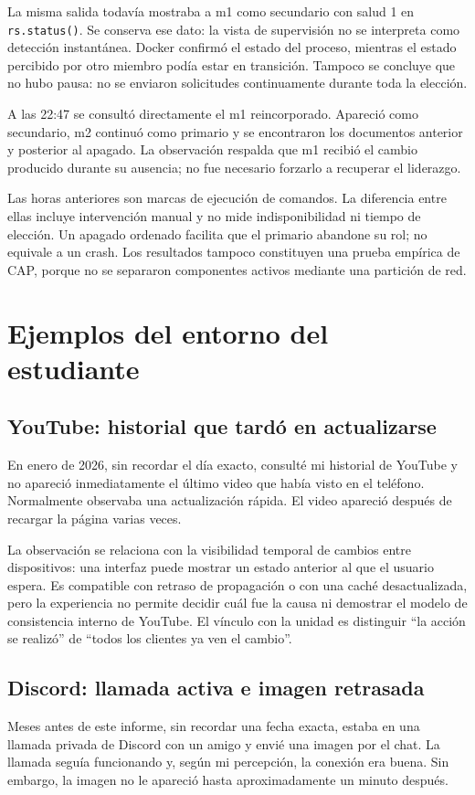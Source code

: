 La misma salida todavía mostraba a m1 como secundario con salud 1 en \texttt{rs.status()}. Se conserva ese dato: la vista de supervisión no se interpreta como detección instantánea. Docker confirmó el estado del proceso, mientras el estado percibido por otro miembro podía estar en transición. Tampoco se concluye que no hubo pausa: no se enviaron solicitudes continuamente durante toda la elección.

A las 22:47 se consultó directamente el m1 reincorporado. Apareció como secundario, m2 continuó como primario y se encontraron los documentos anterior y posterior al apagado. La observación respalda que m1 recibió el cambio producido durante su ausencia; no fue necesario forzarlo a recuperar el liderazgo.

Las horas anteriores son marcas de ejecución de comandos. La diferencia entre ellas incluye intervención manual y no mide indisponibilidad ni tiempo de elección. Un apagado ordenado facilita que el primario abandone su rol; no equivale a un crash. Los resultados tampoco constituyen una prueba empírica de CAP, porque no se separaron componentes activos mediante una partición de red.

\section{Ejemplos del entorno del estudiante}
\subsection{YouTube: historial que tardó en actualizarse}
En enero de 2026, sin recordar el día exacto, consulté mi historial de YouTube y no apareció inmediatamente el último video que había visto en el teléfono. Normalmente observaba una actualización rápida. El video apareció después de recargar la página varias veces.

La observación se relaciona con la visibilidad temporal de cambios entre dispositivos: una interfaz puede mostrar un estado anterior al que el usuario espera. Es compatible con retraso de propagación o con una caché desactualizada, pero la experiencia no permite decidir cuál fue la causa ni demostrar el modelo de consistencia interno de YouTube. El vínculo con la unidad es distinguir ``la acción se realizó'' de ``todos los clientes ya ven el cambio''.

\subsection{Discord: llamada activa e imagen retrasada}
Meses antes de este informe, sin recordar una fecha exacta, estaba en una llamada privada de Discord con un amigo y envié una imagen por el chat. La llamada seguía funcionando y, según mi percepción, la conexión era buena. Sin embargo, la imagen no le apareció hasta aproximadamente un minuto después.

